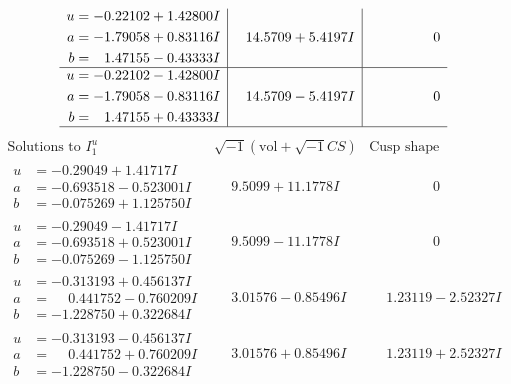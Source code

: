 \documentclass[1p]{elsarticle_modified}
\theoremstyle{definition}
\newcommand{\I}{\sqrt{-1}}
\begin{document}
$$\begin{array}{c|c|c}
\begin{aligned}
u &= -0.22102 + 1.42800 I \\
a &= -1.79058 + 0.83116 I \\
b &= \phantom{-}1.47155 - 0.43333 I\end{aligned}
 & \phantom{-}14.5709 + 5.4197 I & \phantom{-0.000000 } 0 \\ \hline\begin{aligned}
u &= -0.22102 - 1.42800 I \\
a &= -1.79058 - 0.83116 I \\
b &= \phantom{-}1.47155 + 0.43333 I\end{aligned}
 & \phantom{-}14.5709 - 5.4197 I & \phantom{-0.000000 } 0\\
 \hline 
 \end{array}$$\newpage$$\begin{array}{c|c|c}  
\text{Solutions to }I^u_{1}& \I (\text{vol} + \sqrt{-1}CS) & \text{Cusp shape}\\
 \hline 
\begin{aligned}
u &= -0.29049 + 1.41717 I \\
a &= -0.693518 - 0.523001 I \\
b &= -0.075269 + 1.125750 I\end{aligned}
 & \phantom{-}9.5099 + 11.1778 I & \phantom{-0.000000 } 0 \\ \hline\begin{aligned}
u &= -0.29049 - 1.41717 I \\
a &= -0.693518 + 0.523001 I \\
b &= -0.075269 - 1.125750 I\end{aligned}
 & \phantom{-}9.5099 - 11.1778 I & \phantom{-0.000000 } 0 \\ \hline\begin{aligned}
u &= -0.313193 + 0.456137 I \\
a &= \phantom{-}0.441752 - 0.760209 I \\
b &= -1.228750 + 0.322684 I\end{aligned}
 & \phantom{-}3.01576 - 0.85496 I & \phantom{-}1.23119 - 2.52327 I \\ \hline\begin{aligned}
u &= -0.313193 - 0.456137 I \\
a &= \phantom{-}0.441752 + 0.760209 I \\
b &= -1.228750 - 0.322684 I\end{aligned}
 & \phantom{-}3.01576 + 0.85496 I & \phantom{-}1.23119 + 2.52327 I \\ \hline\begin{aligned}

\end{aligned}
\end{array}$$
\end{document}
